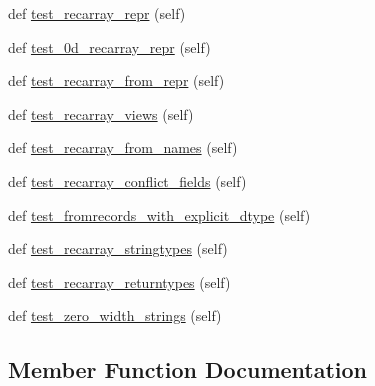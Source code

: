 \begin{DoxyCompactItemize}
def \hyperlink{classnumpy_1_1core_1_1tests_1_1test__records_1_1TestFromrecords_acc7e0a2c806ddebb53c92a54119a50eb}{test\+\_\+recarray\+\_\+repr} (self)
\item 
def \hyperlink{classnumpy_1_1core_1_1tests_1_1test__records_1_1TestFromrecords_a142cb0c332e2e2e73e0fe4585fe4c1cf}{test\+\_\+0d\+\_\+recarray\+\_\+repr} (self)
\item 
def \hyperlink{classnumpy_1_1core_1_1tests_1_1test__records_1_1TestFromrecords_ad1264187f6f10f2c67d2d67de50f2ccb}{test\+\_\+recarray\+\_\+from\+\_\+repr} (self)
\item 
def \hyperlink{classnumpy_1_1core_1_1tests_1_1test__records_1_1TestFromrecords_a9f01317de3e0087afac9c685f936d575}{test\+\_\+recarray\+\_\+views} (self)
\item 
def \hyperlink{classnumpy_1_1core_1_1tests_1_1test__records_1_1TestFromrecords_a48f8ca44fffd2be742345a128b4c53ba}{test\+\_\+recarray\+\_\+from\+\_\+names} (self)
\item 
def \hyperlink{classnumpy_1_1core_1_1tests_1_1test__records_1_1TestFromrecords_a361cc7445c3dcfff2c3a5bbe564cfc09}{test\+\_\+recarray\+\_\+conflict\+\_\+fields} (self)
\item 
def \hyperlink{classnumpy_1_1core_1_1tests_1_1test__records_1_1TestFromrecords_adf99f1d07f650c4be0af9b334759d757}{test\+\_\+fromrecords\+\_\+with\+\_\+explicit\+\_\+dtype} (self)
\item 
def \hyperlink{classnumpy_1_1core_1_1tests_1_1test__records_1_1TestFromrecords_af3773ff019dab9f7b67881b038508b64}{test\+\_\+recarray\+\_\+stringtypes} (self)
\item 
def \hyperlink{classnumpy_1_1core_1_1tests_1_1test__records_1_1TestFromrecords_a6ddd64f05415711cf679e7fb9d009c26}{test\+\_\+recarray\+\_\+returntypes} (self)
\item 
def \hyperlink{classnumpy_1_1core_1_1tests_1_1test__records_1_1TestFromrecords_aefc39c79779b81971327782fae06797e}{test\+\_\+zero\+\_\+width\+\_\+strings} (self)
\end{DoxyCompactItemize}


\subsection{Member Function Documentation}
\mbox{\label{classnumpy_1_1core_1_1tests_1_1test__records_1_1TestFromrecords_a142cb0c332e2e2e73e0fe4585fe4c1cf}} 
